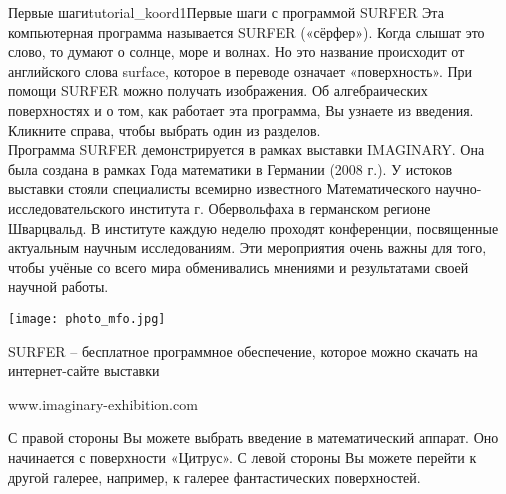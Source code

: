 \begin{surferIntroPage}{Первые шаги}{tutorial_koord1}{Первые шаги с программой SURFER}
Эта компьютерная программа называется SURFER («сёрфер»). Когда слышат это слово, то думают о солнце, море и волнах. Но это название происходит от английского слова surface, которое в переводе означает «поверхность». При помощи SURFER можно получать изображения. Об алгебраических поверхностях и о том, как работает эта программа, Вы узнаете из введения. Кликните справа, чтобы выбрать один из разделов.
\\
Программа SURFER демонстрируется в рамках выставки IMAGINARY. Она была создана в рамках Года математики в Германии (2008 г.). У истоков выставки стояли специалисты всемирно известного Математического научно-исследовательского института г. Обервольфаха в германском регионе Шварцвальд. В институте каждую неделю проходят конференции, посвященные актуальным научным исследованиям. Эти мероприятия очень важны для того, чтобы учёные со всего мира обменивались мнениями и результатами своей научной работы.
\vspace{-1ex}
\begin{center}
\texttt{[image: photo\_mfo.jpg]}
\end{center}
\vspace{-2ex}
SURFER – бесплатное программное обеспечение, которое можно скачать на интернет-сайте выставки
\vspace{-3ex}
\begin{center}
www.imaginary-exhibition.com
\end{center}
\vspace{-2ex}
С правой стороны Вы можете выбрать введение в математический аппарат. Оно начинается с поверхности «Цитрус». С левой стороны Вы можете перейти к другой галерее, например, к галерее фантастических поверхностей.
\end{surferIntroPage}

